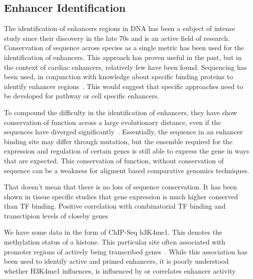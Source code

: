         \subsection{Enhancer Identification}
        
        The identification of enhancers regions in DNA has been a subject of intense study since their discovery in the late 70s and is an active field of research.
        Conservation of sequence across species as a single metric has been used for the identification of enhancers. This approach has proven useful in the past, but in the context of cardiac enhancers, relatively few have been found. Sequencing has been used, in conjunction with knowledge about specific binding proteins to identify enhancer regions~\cite{blow2010chip}. This would suggest that specific approaches need to be developed for pathway or cell specific enhancers. 
        
        
        
        To compound the difficulty in the identification of enhancers, they have show conservation of function across a large evolutionary distance, even if the sequences have diverged significantly~\cite{tautz2000evolution}. Essentially, the sequence in an enhancer binding site may differ through mutation, but the ensemble required for the expression and regulation of certain genes is still able to express the gene in ways that are expected. This conservation of function, without conservation of sequence can be a weakness for aligment based comparative genomics techniques. 
        
        
        
        
        That doesn't mean that there is no loss of sequence conservation. It has been shown in tissue specific studies that gene expression is much higher conserved than TF binding. Positive correlation with combinatorial TF binding and transctipion levels of closeby genes~\cite{wong2014decoupling}
        
        We have some data in the form of ChIP-Seq h3K4me1. This denotes the methylation status of a histone. This particular site often associated with promoter regions of actively being transcribed genes~\cite{barski2007high}. 
        While this association has been used to identify active and primed enhancers, it is poorly understood whether H3K4me1 influences, is influenced by or correlates enhancer activity~\cite{rada2018h3k4me1}
        
